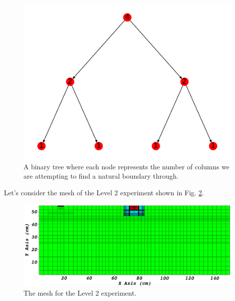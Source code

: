 \begin{figure}[h]
\centering
\includegraphics[scale=0.75]{../figures/binary_tree.pdf}
\caption{A binary tree where each node represents the number of columns we are attempting to find a natural boundary through.}
\label{binary_tree}
\end{figure}

Let's consider the mesh of the Level 2 experiment shown in Fig. \ref{level2_nocut}.

\begin{figure}[h]
\centering
\includegraphics[scale=0.3]{../../figures/level2_nocut.png}
\caption{The mesh for the Level 2 experiment.}
\label{level2_nocut}
\end{figure}


